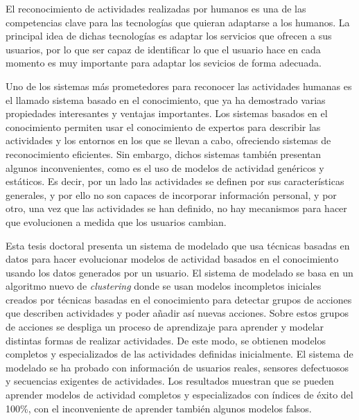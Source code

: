 \begin{resumen}        %


El reconocimiento de actividades realizadas por humanos es una de las competencias clave para las tecnologías que quieran adaptarse a los humanos. La principal idea de dichas tecnologías es adaptar los servicios que ofrecen a sus usuarios, por lo que ser capaz de identificar lo que el usuario hace en cada momento es muy importante para adaptar los sevicios de forma adecuada.

Uno de los sistemas más prometedores para reconocer las actividades humanas es el llamado sistema basado en el conocimiento, que ya ha demostrado varias propiedades interesantes y ventajas importantes. Los sistemas basados en el conocimiento permiten usar el conocimiento de expertos para describir las actividades y los entornos en los que se llevan a cabo, ofreciendo sistemas de reconocimiento eficientes. Sin embargo, dichos sistemas también presentan algunos inconvenientes, como es el uso de modelos de actividad genéricos y estáticos. Es decir, por un lado las actividades se definen por sus características generales, y por ello no son capaces de incorporar información personal, y por otro, una vez que las actividades se han definido, no hay mecanismos para hacer que evolucionen a medida que los usuarios cambian.

Esta tesis doctoral presenta un sistema de modelado que usa técnicas basadas en datos para hacer evolucionar modelos de actividad basados en el conocimiento usando los datos generados por un usuario. El sistema de modelado se basa en un algoritmo nuevo de \textit{clustering} donde se usan modelos incompletos iniciales creados por técnicas basadas en el conocimiento para detectar grupos de acciones que describen actividades y poder añadir así nuevas acciones. Sobre estos grupos de acciones se despliga un proceso de aprendizaje para aprender y modelar distintas formas de realizar actividades. De este modo, se obtienen modelos completos y especializados de las actividades definidas inicialmente. El sistema de modelado se ha probado con información de usuarios reales, sensores defectuosos y secuencias exigentes de actividades. Los resultados muestran que se pueden aprender modelos de actividad completos y especializados con índices de éxito del 100\%, con el inconveniente de aprender también algunos modelos falsos.


\end{resumen}

